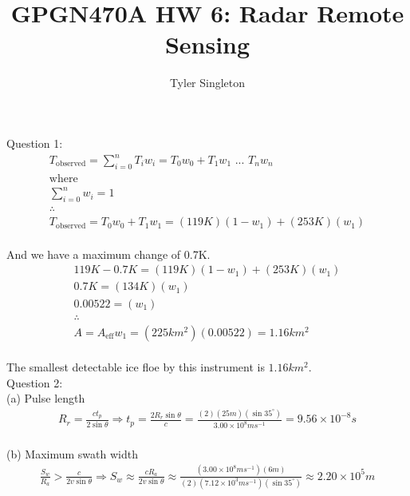 \documentclass{homework}
\title{GPGN470A HW 6: Radar Remote Sensing}
\author{Tyler Singleton}
\begin{document}
\maketitle

Question 1: \\ 
\begin{gather*}
    T_{\text{observed}} = \sum\limits_{i=0}^n T_i w_i
    = T_0 w_0 + T_1 w_1 \text{ ... } T_n w_n \\ 
    \text{where} \nonumber \\ 
    \sum\limits_{i=0}^n w_i = 1 \\
    \therefore \nonumber \\
    T_{\text{observed}} = T_0 w_0 + T_1 w_1 = (119K)(1-w_1) + (253K)(w_1) 
\end{gather*} \\

And we have a maximum change of 0.7K.\\

\begin{gather*}
    119K - 0.7K = (119K)(1-w_1) + (253K)(w_1)\\
    0.7K = (134K)(w_1) \\
    0.00522 = (w_1)\\
    \therefore \\
    A = A_{\text{eff}} w_1 = (225km^2)(0.00522) = 1.16km^2
\end{gather*} \\

The smallest detectable ice floe by this instrument is $1.16km^2$. \\

Question 2: \\

(a) Pulse length \\
\begin{gather*}
    R_r = \frac{ct_p}{2 \sin \theta} \Rightarrow t_p = \frac{2R_r\sin \theta}{c} 
    = \frac{(2)(25m)(\sin 35^\circ)}{3.00 \times 10^8 ms^{-1}} = 9.56 \times 10^{-8}s
    \end{gather*} \\

(b) Maximum swath width \\
\begin{gather*}
    \frac{S_w}{R_a} > \frac{c}{2v\sin\theta} \Rightarrow S_w \approx \frac{c R_a}{2v\sin\theta} 
    \approx \frac{(3.00 \times 10^8 ms^{-1})(6m)}{(2)(7.12 \times 10^3 ms^{-1})(\sin 35^\circ)}
    \approx 2.20 \times 10^5 m
\end{gather*} \\
\end{document}
